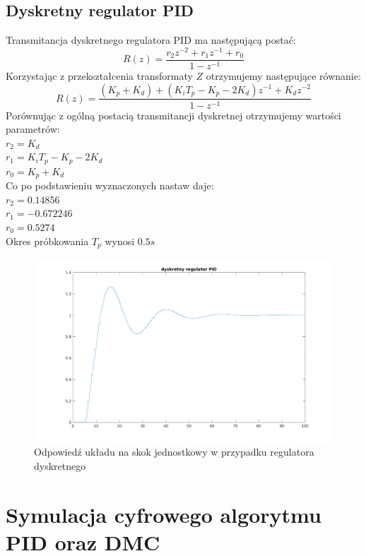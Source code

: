 \documentclass[a4paper, 11pt]{article}
\begin{document}
\subsection{Dyskretny regulator PID}
Transmitancja dyskretnego regulatora PID ma następującą postać: 
$$R(z) = \frac{r_2z^{-2} + r_1z^{-1} + r_0}{1-z^{-1}}$$
Korzystając z przekształcenia transformaty $Z$ otrzymujemy następujące równanie: 
$$R(z) = \frac{(K_p+K_d)+(K_iT_p-K_p-2K_d)z^{-1} + K_dz^{-2}}{1-z^{-1}}$$
Porównując z ogólną postacią transmitancji dyskretnej otrzymujemy wartości parametrów: \\

$r_2 = K_d$\\
\indent$r_1 = K_iT_p -K_p-2K_d$\\
\indent$r_0 = K_p + K_d$\\

\noindent Co po podstawieniu wyznaczonych nastaw daje: \\

$r_2 = 0.14856$\\ 
\indent $r_1 = -0.672246$\\
\indent $r_0 = 0.5274$\\

Okres próbkowania $T_p$ wynosi $0.5s$

\begin{figure}[htp]
\centering
\includegraphics[scale=0.60]{2_2.png}
\caption{Odpowiedź układu na skok jednostkowy w przypadku regulatora dyskretnego}
\end{figure}

\section{Symulacja cyfrowego algorytmu PID oraz DMC }
\end{document}
